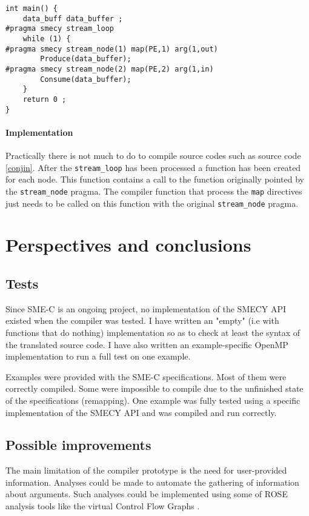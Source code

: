 \documentclass [A4]{article}
\begin{document}
	\begin{lstlisting}[label=conjin,caption={Input code with streaming and mapping pragmas. Definitions of functions \texttt{Produce} and \texttt{Consume} are not shown.}]
int main() {
	data_buff data_buffer ;
#pragma smecy stream_loop
	while (1) {
#pragma smecy stream_node(1) map(PE,1) arg(1,out)
		Produce(data_buffer);
#pragma smecy stream_node(2) map(PE,2) arg(1,in)
		Consume(data_buffer);
	}
	return 0 ;
}
	\end{lstlisting}
	
	\paragraph{Implementation} Practically there is not much to do to compile source codes such as source code \ref{conjin}. After the \verb+stream_loop+ has been processed a function has been created for each node. This function contains a call to the function originally pointed by the \verb+stream_node+ pragma. The compiler function that process the \verb+map+ directives just needs to be called on this function with the original \verb+stream_node+ pragma.

\section{Perspectives and conclusions}
	\subsection{Tests}
	Since SME-C is an ongoing project, no implementation of the SMECY API existed when the compiler was tested. I have written an "empty" (i.e with functions that do nothing) implementation so as to check at least the syntax of the translated source code. I have also written an example-specific OpenMP implementation to run a full test on one example.
	
	Examples were provided with the SME-C specifications. Most of them were correctly compiled. Some were impossible to compile due to the unfinished state of the specifications (remapping). One example was fully tested using a specific implementation of the SMECY API and was compiled and run correctly.
	
	\subsection{Possible improvements}
	The main limitation of the compiler prototype is the need for user-provided information. Analyses could be made to automate the gathering of information about arguments. Such analyses could be implemented using some of ROSE analysis tools like the virtual Control Flow Graphs \cite{tuto}.
	
\end{document}
